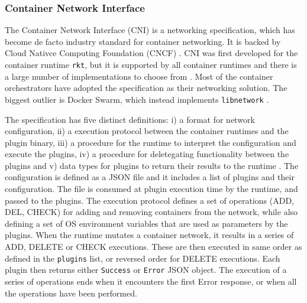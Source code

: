 \documentclass[english,12pt,a4paper,pdftex,sci,utf8]{aaltothesis}
\begin{document}

\subsubsection{Container Network Interface}

The Container Network Interface (CNI) \cite{cni} is a networking specification, which has become de facto industry standard for container networking. It is backed by Cloud Nativce Computing Foundation (CNCF) \cite{qi2020assessing}. CNI was first developed for the container runtime \texttt{rkt}, but it is supported by all container runtimes and there is a large number of implementations to choose from \cite{hausenblas2018container}. Most of the container orchestrators have adopted the specification as their networking solution. The biggest outlier is Docker Swarm, which instead implements \texttt{libnetwork} \cite{libnetwork}.

The specification has five distinct definitions: i) a format for network configuration, ii) a execution protocol between the container runtimes and the plugin binary, iii) a procedure for the runtime to interpret the configuration and execute the plugins, iv) a procedure for deletegating functionality between the plugins and v) data types for plugins to return their results to the runtime \cite{cni}. The configuration is defined as a JSON file and it includes a list of plugins and their configuration. The file is consumed at plugin execution time by the runtime, and passed to the plugins. The execution protocol defines a set of operations (ADD, DEL, CHECK) for adding and removing containers from the network, while also defining a set of OS environment variables that are used as parameters by the plugins. When the runtime mutates a container network, it results in a series of ADD, DELETE or CHECK executions. These are then executed in same order as defined in the \texttt{plugins} list, or reversed order for DELETE executions. Each plugin then returns either \texttt{Success} or \texttt{Error} JSON object. The execution of a series of operations ends when it encounters the first Error response, or when all the operations have been performed.
\end{document}
